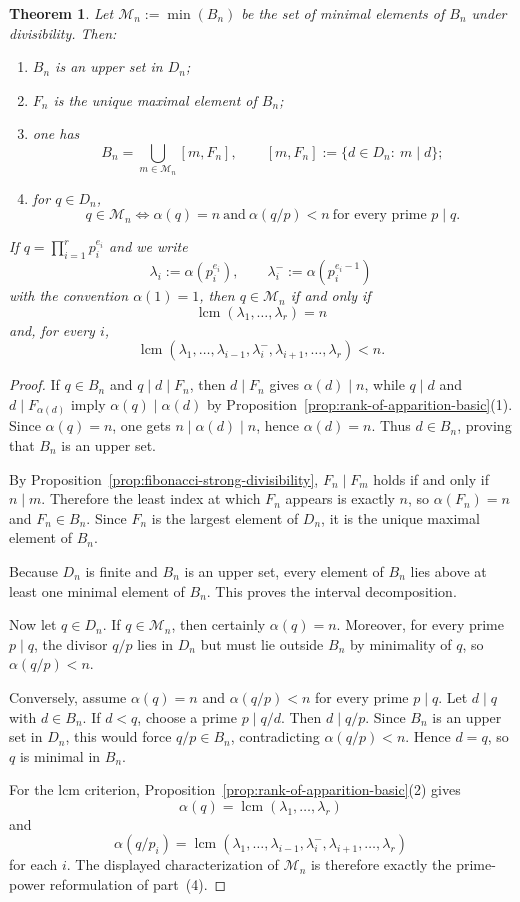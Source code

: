 \documentclass[11pt,letterpaper]{article}
\numberwithin{equation}{section}
\theoremstyle{plain}
\newtheorem{theorem}{Theorem}[section]
\theoremstyle{definition}
\theoremstyle{remark}
\DeclareMathOperator{\lcmop}{lcm}
\begin{document}
\begin{theorem}
\label{thm:minimal-generators}
Let $\mathcal M_n:=\min(B_n)$ be the set of minimal elements of $B_n$ under
divisibility. Then:
\begin{enumerate}[label=(\arabic*)]
\item $B_n$ is an upper set in $D_n$;
\item $F_n$ is the unique maximal element of $B_n$;
\item one has
\[
B_n=\bigcup_{m\in\mathcal M_n}[m,F_n],
\qquad
[m,F_n]:=\{d\in D_n:\ m\mid d\};
\]
\item for $q\in D_n$,
\[
q\in\mathcal M_n
\iff
\alpha(q)=n\ \text{and}\ \alpha(q/p)<n\ \text{for every prime }p\mid q.
\]
\end{enumerate}
If $q=\prod_{i=1}^r p_i^{e_i}$ and we write
\[
\lambda_i:=\alpha(p_i^{e_i}),
\qquad
\lambda_i^-:=\alpha(p_i^{e_i-1})
\]
with the convention $\alpha(1)=1$, then $q\in\mathcal M_n$ if and only if
\[
\lcmop(\lambda_1,\dots,\lambda_r)=n
\]
and, for every $i$,
\[
\lcmop(\lambda_1,\dots,\lambda_{i-1},\lambda_i^-,
\lambda_{i+1},\dots,\lambda_r)<n.
\]
\end{theorem}

\begin{proof}
If $q\in B_n$ and $q\mid d\mid F_n$, then $d\mid F_n$ gives $\alpha(d)\mid n$,
while $q\mid d$ and $d\mid F_{\alpha(d)}$ imply
$\alpha(q)\mid \alpha(d)$ by Proposition~\ref{prop:rank-of-apparition-basic}(1).
Since $\alpha(q)=n$, one gets $n\mid \alpha(d)\mid n$, hence $\alpha(d)=n$.
Thus $d\in B_n$, proving that $B_n$ is an upper set.

By Proposition~\ref{prop:fibonacci-strong-divisibility},
$F_n\mid F_m$ holds if and only if $n\mid m$. Therefore the least index at
which $F_n$ appears is exactly $n$, so $\alpha(F_n)=n$ and $F_n\in B_n$. Since
$F_n$ is the largest element of $D_n$, it is the unique maximal element of
$B_n$.

Because $D_n$ is finite and $B_n$ is an upper set, every element of $B_n$ lies
above at least one minimal element of $B_n$. This proves the interval
decomposition.

Now let $q\in D_n$. If $q\in\mathcal M_n$, then certainly $\alpha(q)=n$.
Moreover, for every prime $p\mid q$, the divisor $q/p$ lies in $D_n$ but must
lie outside $B_n$ by minimality of $q$, so $\alpha(q/p)<n$.

Conversely, assume $\alpha(q)=n$ and $\alpha(q/p)<n$ for every prime $p\mid q$.
Let $d\mid q$ with $d\in B_n$. If $d<q$, choose a prime $p\mid q/d$. Then
$d\mid q/p$. Since $B_n$ is an upper set in $D_n$, this would force
$q/p\in B_n$, contradicting $\alpha(q/p)<n$. Hence $d=q$, so $q$ is minimal in
$B_n$.

For the lcm criterion, Proposition~\ref{prop:rank-of-apparition-basic}(2)
gives
\[
\alpha(q)=\lcmop(\lambda_1,\dots,\lambda_r)
\]
and
\[
\alpha(q/p_i)=
\lcmop(\lambda_1,\dots,\lambda_{i-1},\lambda_i^-,
\lambda_{i+1},\dots,\lambda_r)
\]
for each $i$. The displayed characterization of $\mathcal M_n$ is therefore
exactly the prime-power reformulation of part~(4).
\end{proof}
\end{document}
